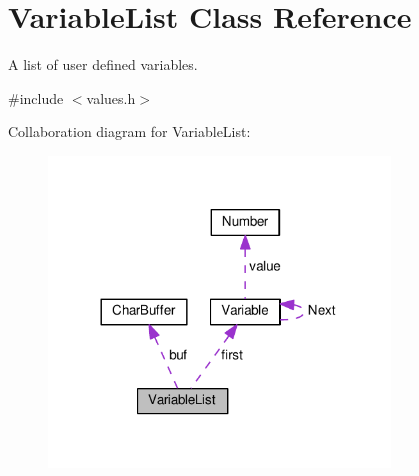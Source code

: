 \hypertarget{classVariableList}{}\section{Variable\+List Class Reference}
\label{classVariableList}


A list of user defined variables.  




{\ttfamily \#include $<$values.\+h$>$}



Collaboration diagram for Variable\+List\+:
\nopagebreak
\begin{figure}[H]
\begin{center}
\leavevmode
\includegraphics[width=257pt]{dd/dce/classVariableList__coll__graph}
\end{center}
\end{figure}
